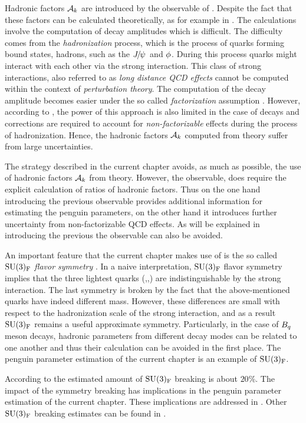 Hadronic factors $\mathcal{A}_{k}$ are introduced by the  observable of .
Despite the fact that these factors can be calculated theoretically, as for example
in \cite{DeBruyn-thesis}. The calculations involve the computation of \BJpsiX decay amplitudes
which is difficult. The difficulty comes from the {\it hadronization} process, which is the
process of quarks forming bound states, hadrons, such as the ${J\mskip -3mu/\mskip -2mu\psi\mskip 2mu}$ and $\phi$.
During this process quarks might interact with each other via the strong interaction.
This class of strong interactions, also referred to as {\it long distance QCD effects}
cannot be computed within the context of {\it perturbation theory}.
The computation of the \BJpsiX decay amplitude becomes easier under the so called
{\it factorization} assumption \cite{HAAN1970448,Wirbel1985,CABIBBO1978418,FAKIROV1978315}.
However, according to \cite{DeBruyn-thesis},
the power of this approach is also limited in the case of \BJpsiX decays and corrections
are required to account for {\it non-factorizable} effects during the process of hadronization.
Hence, the hadronic factors $\mathcal{A}_{k}$ computed from theory suffer from large uncertainties.

The strategy described in the current chapter avoids, as much as possible, the use of hadronic
factors $\mathcal{A}_{k}$ from theory. However, the  observable, does require the explicit
calculation of ratios of hadronic factors. Thus on the one hand
introducing the previous observable provides additional information for estimating the penguin
parameters, on the other hand it introduces further uncertainty from non-factorizable QCD effects.
As will be explained in  introducing the previous the 
observable can also be avoided.

An important feature that the current chapter makes use of is the so called
$\mathrm{SU}(3)_{\rm F}$ {\it flavor symmetry} \cite{GELLMANN1964214,NEEMAN1961222}.
In a naive interpretation, $\mathrm{SU}(3)_{\rm F}$ flavor symmetry implies that the three lightest quarks (\uquark,\dquark,\squark)
are indistinguishable by the strong interaction. The last symmetry is broken by the fact that the above-mentioned
quarks have indeed different mass. However, these differences are small with respect
to the hadronization scale \lqcd of the strong interaction, and as a result $\mathrm{SU}(3)_{\rm F}$
remains a useful approximate symmetry. Particularly, in the case of $B_q$ meson decays, hadronic
parameters from different decay modes can be related to one another and thus their calculation can be avoided
in the first place. The penguin parameter estimation of the current chapter is an example of $\mathrm{SU}(3)_{\rm F}$.

According to \cite{Nagashima:2007qn,Gronau:2013mda} the estimated amount of $\mathrm{SU}(3)_{\rm F}$ breaking is about $20\%$.
The impact of the symmetry breaking has implications in the penguin parameter estimation
of the current chapter. These implications are addressed in .
Other $\mathrm{SU}(3)_{\rm F}$ breaking estimates can be found in \cite{Charles:2015gya,PDG}.
